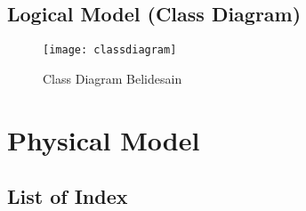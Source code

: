 \subsection{Logical Model (Class Diagram)}

\begin{figure}[H]
	\centering
	\texttt{[image: classdiagram]}
	\caption{Class Diagram Belidesain}
\end{figure}

\section{Physical Model}
\subsection{List of Index}
